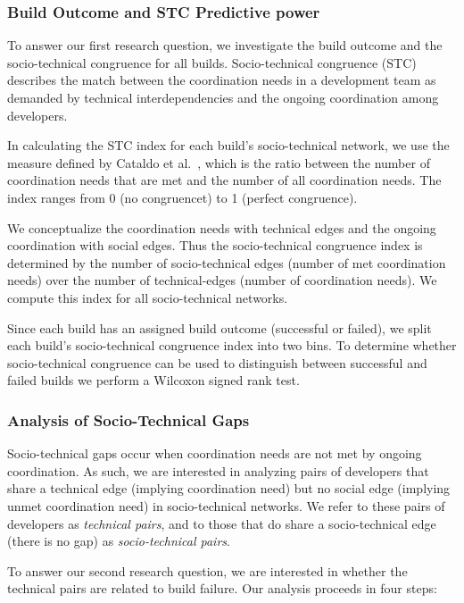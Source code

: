 \documentclass{sig-alternate}
\begin{document}
\subsubsection{Build Outcome and STC Predictive power}
To answer our first research question, we investigate the build outcome and the
socio-technical congruence for all builds. Socio-technical congruence (STC)
describes the match between the coordination needs in a development team as
demanded by technical interdependencies and the ongoing coordination among
developers. 

In calculating the STC index for each build's socio-technical network, we
use the measure defined by Cataldo et al.~\cite{cataldo:cscw:2006}, which is the ratio between the
number of coordination needs that are met and the number of all 
coordination needs.
The index ranges from 0 (no congruencet) to 1 (perfect congruence).

We conceptualize the coordination needs with technical edges and
the ongoing coordination with social edges. Thus the socio-technical congruence
index is determined by the number of socio-technical edges (number of met
coordination needs) over the number of technical-edges (number
of coordination needs). We compute this index for all socio-technical networks.

Since each build has an assigned build outcome (successful
or failed), we split each build's  socio-technical congruence index
into two bins. To determine whether socio-technical congruence can be used to distinguish between
successful and failed builds we perform a Wilcoxon signed rank test.


\subsubsection{Analysis of Socio-Technical Gaps}
Socio-technical gaps occur when coordination needs are not met by ongoing
coordination. As such, we are interested in analyzing pairs of developers that
share a technical edge (implying coordination need) but no social edge (implying
unmet coordination need) in socio-technical networks. We refer to these pairs of
developers as \emph{technical pairs}, and to those that do share a
socio-technical edge (there is no gap) as \emph{socio-technical pairs}. 

To answer our second research question, we are interested in whether the
technical pairs are related to build
failure. Our analysis proceeds in four steps:
\end{document}

